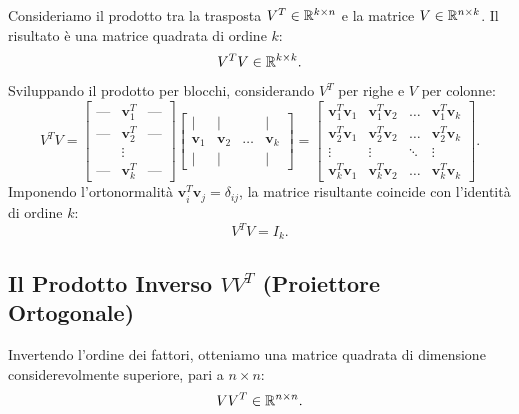 Consideriamo il prodotto tra la trasposta $V^T \in \mathbb{R}^{k \times n}$ e la matrice $V \in \mathbb{R}^{n \times k}$. Il risultato \`e una matrice quadrata di ordine $k$:
\begin{equation}
    V^T V \in \mathbb{R}^{k \times k}.
\end{equation}
Sviluppando il prodotto per blocchi, considerando $V^T$ per righe e $V$ per colonne:
\begin{equation}
    V^T V = \begin{bmatrix} \text{---} & \mathbf{v}_1^T & \text{---} \\ \text{---} & \mathbf{v}_2^T & \text{---} \\ & \vdots & \\ \text{---} & \mathbf{v}_k^T & \text{---} \end{bmatrix} \begin{bmatrix} \mid & \mid & & \mid \\ \mathbf{v}_1 & \mathbf{v}_2 & \dots & \mathbf{v}_k \\ \mid & \mid & & \mid \end{bmatrix} = \begin{bmatrix} \mathbf{v}_1^T \mathbf{v}_1 & \mathbf{v}_1^T \mathbf{v}_2 & \dots & \mathbf{v}_1^T \mathbf{v}_k \\ \mathbf{v}_2^T \mathbf{v}_1 & \mathbf{v}_2^T \mathbf{v}_2 & \dots & \mathbf{v}_2^T \mathbf{v}_k \\ \vdots & \vdots & \ddots & \vdots \\ \mathbf{v}_k^T \mathbf{v}_1 & \mathbf{v}_k^T \mathbf{v}_2 & \dots & \mathbf{v}_k^T \mathbf{v}_k \end{bmatrix}.
\end{equation}
Imponendo l'ortonormalit\`a $\mathbf{v}_i^T \mathbf{v}_j = \delta_{ij}$, la matrice risultante coincide con l'identit\`a di ordine $k$:
\begin{equation}
    V^T V = I_k.
\end{equation}

\subsection{Il Prodotto Inverso \texorpdfstring{$V V^T$}{V V\textasciicircum T} (Proiettore Ortogonale)}

Invertendo l'ordine dei fattori, otteniamo una matrice quadrata di dimensione considerevolmente superiore, pari a $n \times n$:
\begin{equation}
    V V^T \in \mathbb{R}^{n \times n}.
\end{equation}

